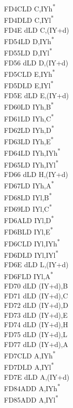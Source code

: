 \documentclass[twoside,openright,a4paper]{book}
\begin{document}
\begin{multicols}{3}
{\begin{tabbing}
	FD4C\>LD C,IYh\textsuperscript{*}\\
	FD4D\>LD C,IYl\textsuperscript{*}\\
	FD4E d\>LD C,(IY+d)\\
	FD54\>LD D,IYh\textsuperscript{*}\\
	FD55\>LD D,IYl\textsuperscript{*}\\
	FD56 d\>LD D,(IY+d)\\
	FD5C\>LD E,IYh\textsuperscript{*}\\
	FD5D\>LD E,IYl\textsuperscript{*}\\
	FD5E d\>LD E,(IY+d)\\
	FD60\>LD IYh,B\textsuperscript{*}\\
	FD61\>LD IYh,C\textsuperscript{*}\\
	FD62\>LD IYh,D\textsuperscript{*}\\
	FD63\>LD IYh,E\textsuperscript{*}\\
	FD64\>LD IYh,IYh\textsuperscript{*}\\
	FD65\>LD IYh,IYl\textsuperscript{*}\\
	FD66 d\>LD H,(IY+d)\\
	FD67\>LD IYh,A\textsuperscript{*}\\
	FD68\>LD IYl,B\textsuperscript{*}\\
	FD69\>LD IYl,C\textsuperscript{*}\\
	FD6A\>LD IYl,D\textsuperscript{*}\\
	FD6B\>LD IYl,E\textsuperscript{*}\\
	FD6C\>LD IYl,IYh\textsuperscript{*}\\
	FD6D\>LD IYl,IYl\textsuperscript{*}\\
	FD6E d\>LD L,(IY+d)\\
	FD6F\>LD IYl,A\textsuperscript{*}\\
	FD70 d\>LD (IY+d),B\\
	FD71 d\>LD (IY+d),C\\
	FD72 d\>LD (IY+d),D\\
	FD73 d\>LD (IY+d),E\\
	FD74 d\>LD (IY+d),H\\
	FD75 d\>LD (IY+d),L\\
	FD77 d\>LD (IY+d),A\\
	FD7C\>LD A,IYh\textsuperscript{*}\\
	FD7D\>LD A,IYl\textsuperscript{*}\\
	FD7E d\>LD A,(IY+d)\\
	FD84\>ADD A,IYh\textsuperscript{*}\\
	FD85\>ADD A,IYl\textsuperscript{*}\\

\end{tabbing}}
\end{multicols}
\end{document}
